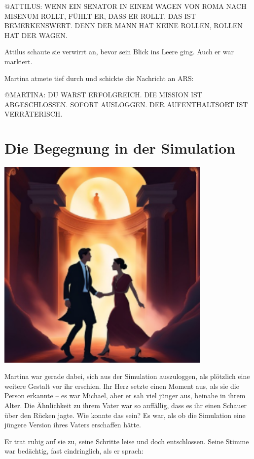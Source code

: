 \documentclass[
]{article}
\begin{document}
@ATTILUS: WENN EIN SENATOR IN EINEM WAGEN VON ROMA NACH MISENUM ROLLT,
FÜHLT ER, DASS ER ROLLT. DAS IST BEMERKENSWERT. DENN DER MANN HAT KEINE
ROLLEN, ROLLEN HAT DER WAGEN.

Attilus schaute sie verwirrt an, bevor sein Blick ins Leere ging. Auch
er war markiert.

Martina atmete tief durch und schickte die Nachricht an ARS:

@MARTINA: DU WARST ERFOLGREICH. DIE MISSION IST ABGESCHLOSSEN. SOFORT
AUSLOGGEN. DER AUFENTHALTSORT IST VERRÄTERISCH.

\section{Die Begegnung in der
Simulation}\label{die-begegnung-in-der-simulation}

\includegraphics[width=4.12135in,height=4.12135in]{media/image8.png}

Martina war gerade dabei, sich aus der Simulation auszuloggen, als
plötzlich eine weitere Gestalt vor ihr erschien. Ihr Herz setzte einen
Moment aus, als sie die Person erkannte -- es war Michael, aber er sah
viel jünger aus, beinahe in ihrem Alter. Die Ähnlichkeit zu ihrem Vater
war so auffällig, dass es ihr einen Schauer über den Rücken jagte. Wie
konnte das sein? Es war, als ob die Simulation eine jüngere Version
ihres Vaters erschaffen hätte.

Er trat ruhig auf sie zu, seine Schritte leise und doch entschlossen.
Seine Stimme war bedächtig, fast eindringlich, als er sprach:
\end{document}
